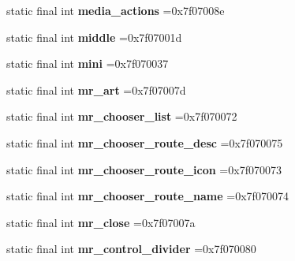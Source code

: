 \begin{DoxyCompactItemize}
static final int {\bfseries media\+\_\+actions} =0x7f07008e
\item 
\mbox{\label{classproject4_1_1xaria_1_1R_1_1id_a9985ef90210824ca44f551159ffdc4fc}} 
static final int {\bfseries middle} =0x7f07001d
\item 
\mbox{\label{classproject4_1_1xaria_1_1R_1_1id_a6c2746fe223b506adf245a4ec4f73e48}} 
static final int {\bfseries mini} =0x7f070037
\item 
\mbox{\label{classproject4_1_1xaria_1_1R_1_1id_a635fefe4593d3f886537baeb1d1051cc}} 
static final int {\bfseries mr\+\_\+art} =0x7f07007d
\item 
\mbox{\label{classproject4_1_1xaria_1_1R_1_1id_a22f2a3e0a617e45866cb46c061a3fdd7}} 
static final int {\bfseries mr\+\_\+chooser\+\_\+list} =0x7f070072
\item 
\mbox{\label{classproject4_1_1xaria_1_1R_1_1id_ae58fe11e335216845e74489bcbb1a6f5}} 
static final int {\bfseries mr\+\_\+chooser\+\_\+route\+\_\+desc} =0x7f070075
\item 
\mbox{\label{classproject4_1_1xaria_1_1R_1_1id_a50bf7d0ae77d4d897d7f63e7753c5580}} 
static final int {\bfseries mr\+\_\+chooser\+\_\+route\+\_\+icon} =0x7f070073
\item 
\mbox{\label{classproject4_1_1xaria_1_1R_1_1id_ad98c0b199eae4e5ec277ee489c2d39a2}} 
static final int {\bfseries mr\+\_\+chooser\+\_\+route\+\_\+name} =0x7f070074
\item 
\mbox{\label{classproject4_1_1xaria_1_1R_1_1id_a70d0fa7987ed36559708e45b032defd2}} 
static final int {\bfseries mr\+\_\+close} =0x7f07007a
\item 
\mbox{\label{classproject4_1_1xaria_1_1R_1_1id_a21d3aa5e11858126223a6338b2f0e18b}} 
static final int {\bfseries mr\+\_\+control\+\_\+divider} =0x7f070080
\item 
\mbox{\label{classproject4_1_1xaria_1_1R_1_1id_ac9e1d280646402265bd2caba90e9196a}} 

\end{DoxyCompactItemize}
